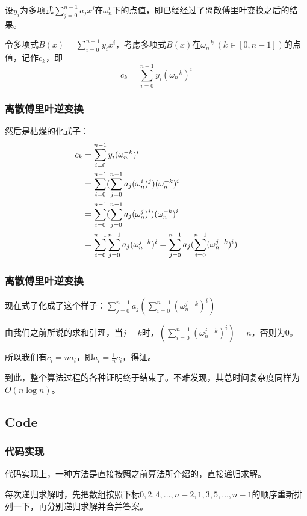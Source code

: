 \documentclass[10pt]{beamer}
\begin{document}
\begin{spacing}{1.2}
\begin{frame}
			设$y_i$为多项式$\displaystyle\sum_{j=0}^{n-1}a_j x^j$在$\omega_n^i$下的点值，即已经经过了离散傅里叶变换之后的结果。

			令多项式$\displaystyle B(x)=\sum_{i=0}^{n-1}y_i x^i$，考虑多项式$B(x)$在$\omega_n^{-k} \ (k \in [0,n-1])$的点值，记作$c_k$，即
			$$c_k=\sum_{i=0}^{n-1}y_i(\omega_n^{-k})^i$$

		\end{frame}

		\begin{frame}
			\frametitle{离散傅里叶逆变换}

			然后是枯燥的化式子： \pause
			\begin{align}
				c_k &= \sum_{i=0}^{n-1}y_i(\omega_n^{-k})^i \notag \\
				&= \sum_{i=0}^{n-1}(\sum_{j=0}^{n-1}a_j(\omega_n^i)^j)(\omega_n^{-k})^i \notag \\
				&= \sum_{i=0}^{n-1}(\sum_{j=0}^{n-1}a_j(\omega_n^j)^i)(\omega_n^{-k})^i \notag \\
				&= \sum_{i=0}^{n-1}\sum_{j=0}^{n-1}a_j(\omega_n^{j-k})^i \notag = \sum_{j=0}^{n-1}a_j(\sum_{i=0}^{n-1}(\omega_n^{j-k})^i) \notag
			\end{align}
		\end{frame}

		\begin{frame}
			\frametitle{离散傅里叶逆变换}

			现在式子化成了这个样子：$\displaystyle\sum_{j=0}^{n-1}a_j(\sum_{i=0}^{n-1}(\omega_n^{j-k})^i)$ \pause

			由我们之前所说的求和引理，当$j = k$时，$(\displaystyle\sum_{i=0}^{n-1}(\omega_n^{j-k})^i) = n$，否则为$0$。 \pause

			所以我们有$c_i = na_i$，即$a_i = \frac{1}{n}c_i$，得证。 \pause

			到此，整个算法过程的各种证明终于结束了。不难发现，其总时间复杂度同样为$O(n \log n)$。
		\end{frame}
		\subsection{Code}

		\begin{frame}
			\frametitle{代码实现}

			代码实现上，一种方法是直接按照之前算法所介绍的，直接递归求解。 \pause

			每次递归求解时，先把数组按照下标$0,2,4,\dots,n-2,1,3,5,\dots,n-1$的顺序重新排列一下，再分别递归求解并合并答案。 \pause


\end{frame}
\end{spacing}
\end{document}
